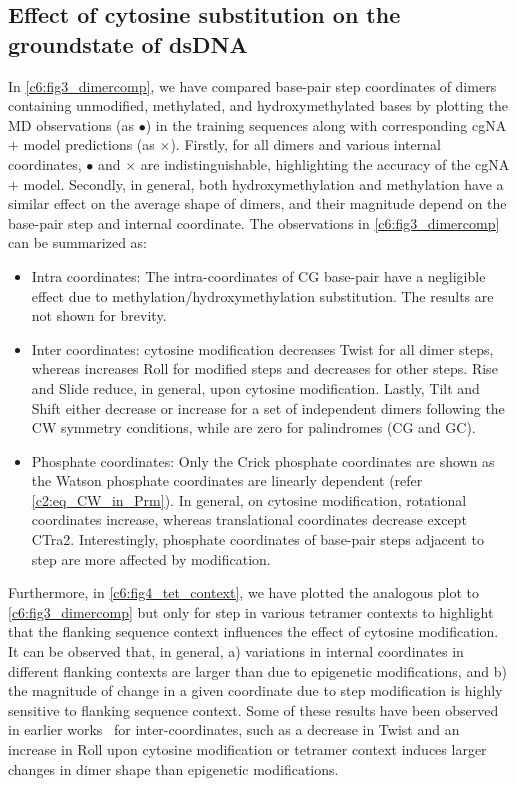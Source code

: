 \subsection{Effect of cytosine substitution on the groundstate of dsDNA}\label{c6:comparison_subsec_gs}
In \cref{c6:fig3_dimercomp}, we have compared base-pair step coordinates of dimers containing unmodified, methylated, and hydroxymethylated bases by plotting the MD observations (as $\bullet$) in the training sequences along with corresponding cgNA$+$ model predictions (as $\times$).
Firstly, for all dimers and various internal coordinates, $\bullet$ and $\times$ are indistinguishable, highlighting the accuracy of the cgNA$+$ model.
Secondly, in general, both hydroxymethylation and methylation have a similar effect on the average shape of dimers, and their magnitude depend on the base-pair step and internal coordinate.
The observations in \cref{c6:fig3_dimercomp} can be summarized as:
\begin{itemize}
\item Intra coordinates: The intra-coordinates of CG base-pair have a negligible effect due to methylation/hydroxymethylation substitution. The results are not shown for brevity. 
\item Inter coordinates: cytosine modification decreases Twist for all dimer steps, whereas increases Roll for modified \cpg steps and decreases for other steps. Rise and Slide reduce, in general, upon cytosine modification. Lastly, Tilt and Shift either decrease or increase for a set of independent dimers following the CW symmetry conditions, while are zero for palindromes (CG and GC). 
\item Phosphate coordinates: Only the Crick phosphate coordinates are shown as the Watson phosphate coordinates are linearly dependent (refer \cref{c2:eq_CW_in_Prm}). In general, on cytosine modification, rotational coordinates increase, whereas translational coordinates decrease except CTra2.
Interestingly, phosphate coordinates of base-pair steps adjacent to \cpg step are more affected by \cpg modification. 
\end{itemize}

Furthermore, in \cref{c6:fig4_tet_context}, we have plotted the analogous plot to \cref{c6:fig3_dimercomp} but only for \cpg step in various tetramer contexts to highlight that the flanking sequence context influences the effect of cytosine modification. 
It can be observed that, in general, 
a) variations in internal coordinates in different flanking contexts are larger than due to epigenetic modifications, and 
b) the magnitude of change in a given coordinate due to \cpg step modification is highly sensitive to flanking sequence context. 
Some of these results have been observed in earlier works~\cite{battistini2021impact,carvalho2014understanding} for inter-coordinates, such as a decrease in Twist and an increase in Roll upon cytosine modification or tetramer context induces larger changes in dimer shape than epigenetic modifications.

